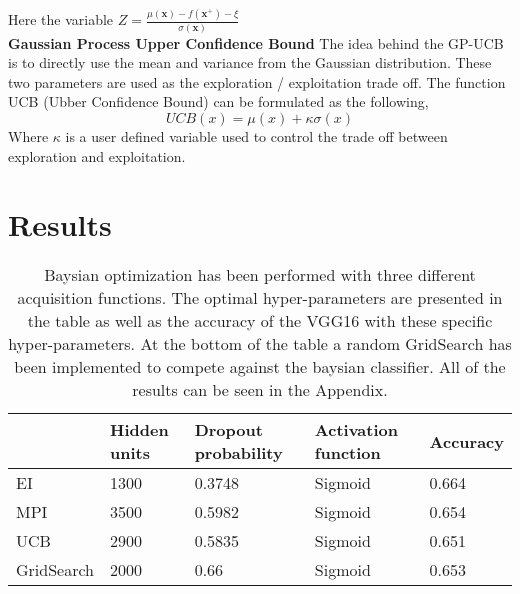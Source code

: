 \documentclass[12pt,fleqn]{article}
\begin{document}
Here the variable $ Z = \frac{\mu(\mathbf{x}) - f(\mathbf{x}^+) - \xi }{\sigma(\mathbf{x})} $ \newline 
\\
\textbf{Gaussian Process Upper Confidence Bound} \newline
The idea behind the GP-UCB is to directly use the mean and variance from the Gaussian distribution. These two parameters are used as the exploration / exploitation trade off. The function UCB (Ubber Confidence Bound) can be formulated as the following, 
\begin{equation*}
UCB(x) = \mu(x) + \kappa \sigma(x)
\end{equation*}
\noindent
Where $ \kappa $ is a user defined variable used to control the trade off between exploration and exploitation. \newline


\section{Results}

\begin{table}[H]
	\begin{tabular}{|l|l|l|l|l|}
		\hline
		& Hidden units & Dropout probability & Activation function & Accuracy \\ \hline
		EI  & 1300         & 0.3748              & Sigmoid             & 0.664          \\ \hline
		MPI & 3500         & 0.5982              & Sigmoid             & 0.654           \\ \hline
		UCB & 2900         & 0.5835              & Sigmoid             & 0.651           \\ \hline
		GridSearch & 2000         & 0.66              & Sigmoid             & 0.653          \\ \hline
	\end{tabular}
\caption{Baysian optimization has been performed with three different acquisition functions. The optimal hyper-parameters are presented in the table as well as the accuracy of the VGG16 with these specific hyper-parameters. At the bottom of the table a random GridSearch has been implemented to compete against the baysian classifier. All of the results can be seen in the Appendix. }
\end{table}
\end{document}
